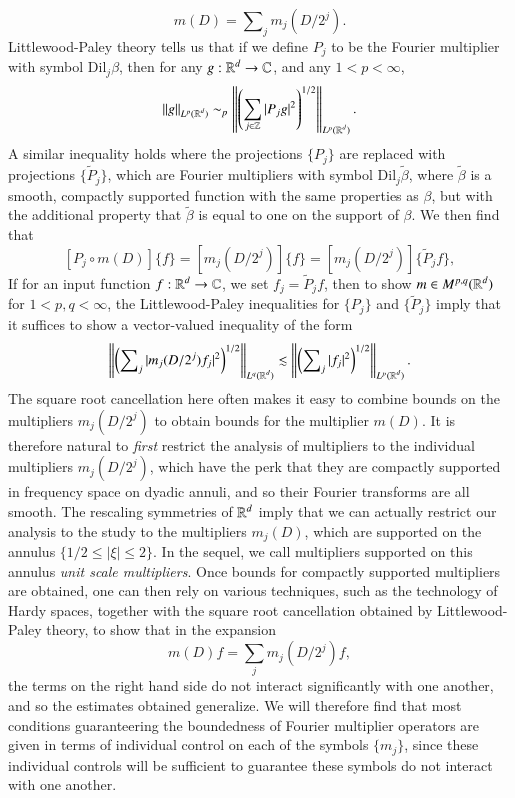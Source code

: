 %
\[ m(D) = \sum\nolimits_j m_j(D / 2^j). \]
%
Littlewood-Paley theory tells us that if we define $P_j$ to be the Fourier multiplier with symbol $\text{Dil}_j \beta$, then for any $g: \operatorname{\mathbb{R}}^d \to \operatorname{\mathbb{C}}$, and any $1 < p < \infty$,
%
\[ \| g \|_{L^p(\operatorname{\mathbb{R}}^d)} \sim_p \left\| \left( \sum_{j \in \operatorname{\mathbb{Z}}} |P_j g|^2 \right)^{1/2} \right\|_{L^p(\operatorname{\mathbb{R}}^d)}. \]
%
A similar inequality holds where the projections $\{ P_j \}$ are replaced with projections $\{ \tilde{P}_j \}$, which are Fourier multipliers with symbol $\text{Dil}_j \tilde{\beta}$, where $\tilde{\beta}$ is a smooth, compactly supported function with the same properties as $\beta$, but with the additional property that $\tilde{\beta}$ is equal to one on the support of $\beta$. We then find that
%
\[ [P_j \circ m(D)] \{ f \} = [m_j(D / 2^j)] \{ f \} = [m_j(D/2^j)] \{ \tilde{P}_j f \}, \]
%
If for an input function $f: \operatorname{\mathbb{R}}^d \to \operatorname{\mathbb{C}}$, we set $f_j = \tilde{P}_j f$, then to show $m \in M^{p,q}(\operatorname{\mathbb{R}}^d)$ for $1 < p,q < \infty$, the Littlewood-Paley inequalities for $\{ P_j \}$ and $\{ \tilde{P}_j \}$ imply that it suffices to show a vector-valued inequality of the form
%
\[ \left\| \left( \sum\nolimits_j |m_j(D/2^j) f_j|^2 \right)^{1/2} \right\|_{L^q(\operatorname{\mathbb{R}}^d)} \lesssim \left\| \left( \sum\nolimits_j |f_j|^2 \right)^{1/2} \right\|_{L^p(\operatorname{\mathbb{R}}^d)}. \]
%
The square root cancellation here often makes it easy to combine bounds on the multipliers $m_j(D/2^j)$ to obtain bounds for the multiplier $m(D)$. It is therefore natural to \emph{first} restrict the analysis of multipliers to the individual multipliers $m_j(D/2^j)$, which have the perk that they are compactly supported in frequency space on dyadic annuli, and so their Fourier transforms are all smooth. The rescaling symmetries of $\operatorname{\mathbb{R}}^d$ imply that we can actually restrict our analysis to the study to the multipliers $m_j(D)$, which are supported on the annulus $\{ 1/2 \leq |\xi| \leq 2 \}$. In the sequel, we call multipliers supported on this annulus \emph{unit scale multipliers}. Once bounds for compactly supported multipliers are obtained, one can then rely on various techniques, such as the technology of Hardy spaces, together with the square root cancellation obtained by Littlewood-Paley theory, to show that in the expansion
%
\[ m(D) f = \sum_j m_j(D/2^j) f, \]
%
the terms on the right hand side do not interact significantly with one another, and so the estimates obtained generalize. We will therefore find that most conditions guaranteering the boundedness of Fourier multiplier operators are given in terms of individual control on each of the symbols $\{ m_j \}$, since these individual controls will be sufficient to guarantee these symbols do not interact with one another.

